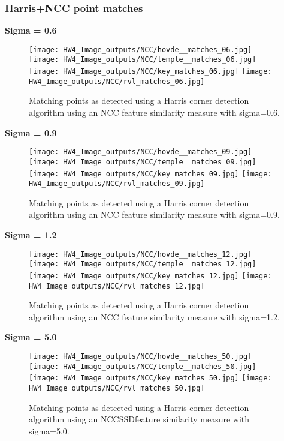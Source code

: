 \documentclass{article}
\begin{document}
\subsubsection{Harris+NCC point matches}
\textbf{Sigma = 0.6}
\begin{figure}[H]
    \centering
    \texttt{[image: HW4\_Image\_outputs/NCC/hovde\_\_matches\_06.jpg]}
    \texttt{[image: HW4\_Image\_outputs/NCC/temple\_\_matches\_06.jpg]}
    \texttt{[image: HW4\_Image\_outputs/NCC/key\_matches\_06.jpg]}
    \texttt{[image: HW4\_Image\_outputs/NCC/rvl\_matches\_06.jpg]}
    \caption{Matching points as detected using a Harris corner detection algorithm using an NCC feature similarity measure with sigma=0.6.}
    \label{fig:ncc-match-06}
\end{figure}
\textbf{Sigma = 0.9}
\begin{figure}[H]
    \centering
    \texttt{[image: HW4\_Image\_outputs/NCC/hovde\_\_matches\_09.jpg]}
    \texttt{[image: HW4\_Image\_outputs/NCC/temple\_\_matches\_09.jpg]}
    \texttt{[image: HW4\_Image\_outputs/NCC/key\_matches\_09.jpg]}
    \texttt{[image: HW4\_Image\_outputs/NCC/rvl\_matches\_09.jpg]}
    \caption{Matching points as detected using a Harris corner detection algorithm using an NCC feature similarity measure with sigma=0.9.}
    \label{fig:ncc-match-09}
\end{figure}
\textbf{Sigma = 1.2}
\begin{figure}[H]
    \centering
    \texttt{[image: HW4\_Image\_outputs/NCC/hovde\_\_matches\_12.jpg]}
    \texttt{[image: HW4\_Image\_outputs/NCC/temple\_\_matches\_12.jpg]}
    \texttt{[image: HW4\_Image\_outputs/NCC/key\_matches\_12.jpg]}
    \texttt{[image: HW4\_Image\_outputs/NCC/rvl\_matches\_12.jpg]}
    \caption{Matching points as detected using a Harris corner detection algorithm using an NCC feature similarity measure with sigma=1.2.}
    \label{fig:ncc-match-12}
\end{figure}
\textbf{Sigma = 5.0}
\begin{figure}[H]
    \centering
    \texttt{[image: HW4\_Image\_outputs/NCC/hovde\_\_matches\_50.jpg]}
    \texttt{[image: HW4\_Image\_outputs/NCC/temple\_\_matches\_50.jpg]}
    \texttt{[image: HW4\_Image\_outputs/NCC/key\_matches\_50.jpg]}
    \texttt{[image: HW4\_Image\_outputs/NCC/rvl\_matches\_50.jpg]}
    \caption{Matching points as detected using a Harris corner detection algorithm using an NCCSSDfeature similarity measure with sigma=5.0.}
    \label{fig:ssd-match-50}
\end{figure}
\end{document}
